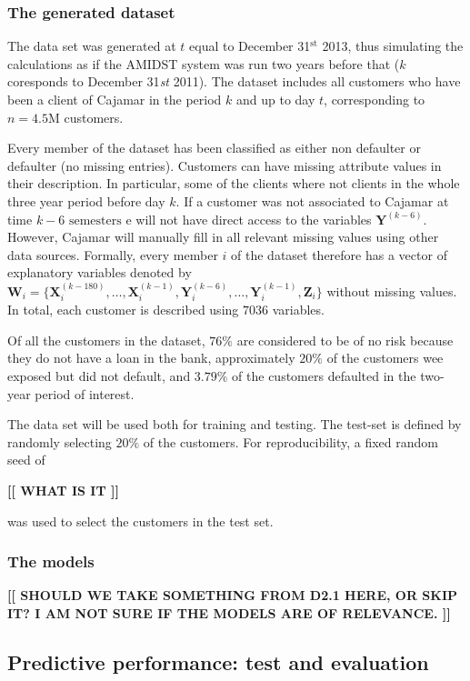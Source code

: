 \documentclass{article}
\theoremstyle{theorem}
\theoremstyle{definition}
\newcommand{\W}{\mathbf{W}}
\newcommand{\X}{\mathbf{X}}
\newcommand{\Y}{\mathbf{Y}}
\newcommand{\Z}{\mathbf{Z}}
\newcommand{\comment}[1]{ \begin{center}{\bf [[ #1 ]]}\end{center}}
\begin{document}
\subsubsection{The generated dataset}

The data set was generated at $t$ equal to December 31$^\text{st}$ 2013, thus simulating the calculations as if the AMIDST system was run two years before that ($k$ coresponds to December 31\textit{st} 2011). 
The dataset includes all customers who have been a client of Cajamar in the period  $k$ and up to day $t$, corresponding to $n=4.5\text{M}$ customers. 

Every member of the dataset has been classified as either non defaulter or defaulter (no missing entries). 
Customers can have missing attribute values in their description. In particular, some of the clients where not clients in the whole three year period before day $k$. If a customer was not associated to Cajamar at time $k - 6 \mbox{ semesters}$ e will not have direct access to the variables $\Y^{(k-6)}$. However, Cajamar will manually fill in all relevant missing values using other data sources.  Formally, every member $i$ of the dataset therefore has a vector of explanatory variables denoted by $\W_i=\{ \X_i^{(k-180)}, \ldots, \X_i^{(k-1)}, \Y_i^{(k-6)},\ldots, \Y_i^{(k-1)},\Z_i\}$ without missing values. In total, each customer is described using $7036$ variables.

Of all the customers in the dataset, $76\%$ are considered to be of no risk because they do not have a loan in the bank, approximately $20\%$ of the customers wee exposed but did not default, and $3.79\%$ of the customers  defaulted in the two-year period of interest. 

The data set will be used both for training and testing. The test-set is defined by randomly selecting $20\%$ of the customers. For reproducibility, a fixed random seed of  \comment{WHAT IS IT} was used to select the customers in the test set. 



\subsubsection{The models}

\comment{ SHOULD WE TAKE SOMETHING FROM D2.1 HERE, OR SKIP IT? I AM NOT SURE IF THE MODELS ARE OF RELEVANCE.}


\subsection{Predictive performance: test and evaluation}
\end{document}
